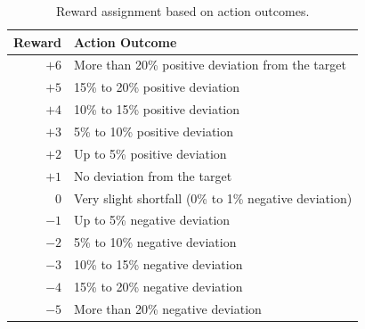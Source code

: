 \documentclass[10pt,twocolumn]{article}
\newcommand{\tabfont}{\fontsize{8.5}{10.5}\selectfont}
\begin{document}
\begin{table}[H]
\caption{Reward assignment based on action outcomes.}
\label{tab:rewards}
\tabfont
\setlength{\tabcolsep}{4pt}
\begin{tabularx}{\columnwidth}{rX}
\toprule
\textbf{Reward} & \textbf{Action Outcome} \\
\midrule
$+6$   & More than 20\% positive deviation from the target \\
$+5$   & 15\% to 20\% positive deviation \\
$+4$   & 10\% to 15\% positive deviation \\
$+3$   & 5\% to 10\% positive deviation \\
$+2$   & Up to 5\% positive deviation \\
$+1$   & No deviation from the target \\
$\phantom{+}0$  & Very slight shortfall (0\% to 1\% negative deviation) \\
$-1$   & Up to 5\% negative deviation \\
$-2$   & 5\% to 10\% negative deviation \\
$-3$   & 10\% to 15\% negative deviation \\
$-4$   & 15\% to 20\% negative deviation \\
$-5$   & More than 20\% negative deviation \\
\bottomrule
\end{tabularx}
\end{table}
\end{document}
